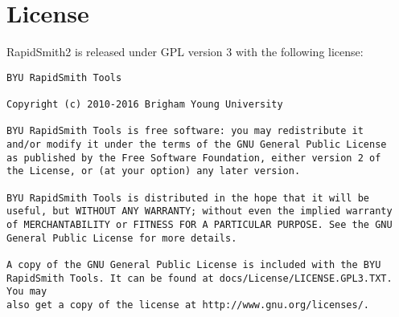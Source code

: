 \newpage
\section{License}
RapidSmith2 is released under GPL version 3 with the following license: 

\begin{verbatim}
BYU RapidSmith Tools

Copyright (c) 2010-2016 Brigham Young University
   
BYU RapidSmith Tools is free software: you may redistribute it
and/or modify it under the terms of the GNU General Public License
as published by the Free Software Foundation, either version 2 of
the License, or (at your option) any later version.
   
BYU RapidSmith Tools is distributed in the hope that it will be
useful, but WITHOUT ANY WARRANTY; without even the implied warranty
of MERCHANTABILITY or FITNESS FOR A PARTICULAR PURPOSE. See the GNU
General Public License for more details.
   
A copy of the GNU General Public License is included with the BYU
RapidSmith Tools. It can be found at docs/License/LICENSE.GPL3.TXT. You may
also get a copy of the license at http://www.gnu.org/licenses/.
\end{verbatim}